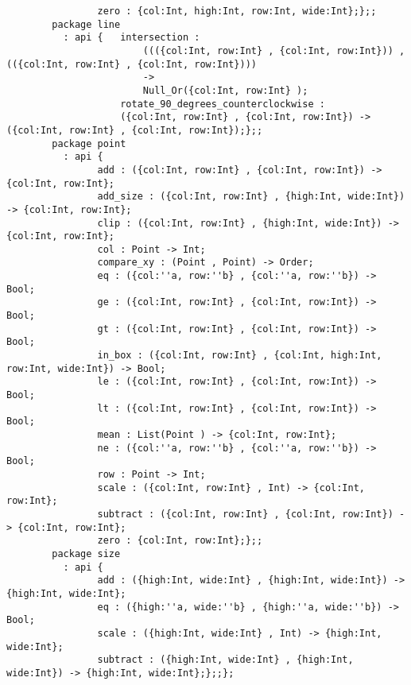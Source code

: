 \begin{verbatim}
                zero : {col:Int, high:Int, row:Int, wide:Int};};;
        package line
          : api {   intersection :
                        ((({col:Int, row:Int} , {col:Int, row:Int})) , (({col:Int, row:Int} , {col:Int, row:Int})))
                        ->
                        Null_Or({col:Int, row:Int} );
                    rotate_90_degrees_counterclockwise :
                    ({col:Int, row:Int} , {col:Int, row:Int}) -> ({col:Int, row:Int} , {col:Int, row:Int});};;
        package point
          : api {
                add : ({col:Int, row:Int} , {col:Int, row:Int}) -> {col:Int, row:Int};
                add_size : ({col:Int, row:Int} , {high:Int, wide:Int}) -> {col:Int, row:Int};
                clip : ({col:Int, row:Int} , {high:Int, wide:Int}) -> {col:Int, row:Int};
                col : Point -> Int;
                compare_xy : (Point , Point) -> Order;
                eq : ({col:''a, row:''b} , {col:''a, row:''b}) -> Bool;
                ge : ({col:Int, row:Int} , {col:Int, row:Int}) -> Bool;
                gt : ({col:Int, row:Int} , {col:Int, row:Int}) -> Bool;
                in_box : ({col:Int, row:Int} , {col:Int, high:Int, row:Int, wide:Int}) -> Bool;
                le : ({col:Int, row:Int} , {col:Int, row:Int}) -> Bool;
                lt : ({col:Int, row:Int} , {col:Int, row:Int}) -> Bool;
                mean : List(Point ) -> {col:Int, row:Int};
                ne : ({col:''a, row:''b} , {col:''a, row:''b}) -> Bool;
                row : Point -> Int;
                scale : ({col:Int, row:Int} , Int) -> {col:Int, row:Int};
                subtract : ({col:Int, row:Int} , {col:Int, row:Int}) -> {col:Int, row:Int};
                zero : {col:Int, row:Int};};;
        package size
          : api {
                add : ({high:Int, wide:Int} , {high:Int, wide:Int}) -> {high:Int, wide:Int};
                eq : ({high:''a, wide:''b} , {high:''a, wide:''b}) -> Bool;
                scale : ({high:Int, wide:Int} , Int) -> {high:Int, wide:Int};
                subtract : ({high:Int, wide:Int} , {high:Int, wide:Int}) -> {high:Int, wide:Int};};;};
\end{verbatim}
